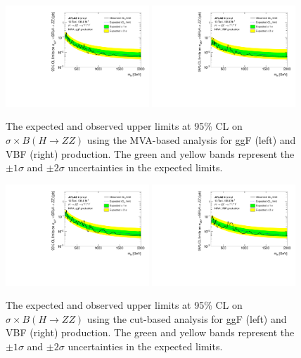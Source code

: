 \begin{figure}[h]
    \centering
    \includegraphics[width=0.48\textwidth]{figures/HMHZZ/results/limits_DNN_ggF.pdf}
    \includegraphics[width=0.48\textwidth]{figures/HMHZZ/results/limits_DNN_VBF.pdf}
    \caption{The expected and observed upper limits at 95\% CL on $\sigma \times B(H \rightarrow ZZ)$ using the MVA-based analysis for ggF (left) and VBF (right) production. The green and yellow bands represent the $\pm 1\sigma$ and $\pm 2\sigma$ uncertainties in the expected limits.
 }
    \label{fig:NWA201518_MVA}
\end{figure}

\begin{figure}[h]
    \centering
    \includegraphics[width=0.48\textwidth]{figures/HMHZZ/results/limits_Cut2020_ggF.pdf}
    \includegraphics[width=0.48\textwidth]{figures/HMHZZ/results/limits_Cut2020_VBF.pdf}
    \caption{The expected and observed upper limits at 95\% CL on $\sigma \times B(H \rightarrow ZZ)$ using the cut-based analysis for ggF (left) and VBF (right) production. The green and yellow bands represent the $\pm 1\sigma$ and $\pm 2\sigma$ uncertainties in the expected limits.
 }
    \label{fig:NWA201518_Cut}
\end{figure}

